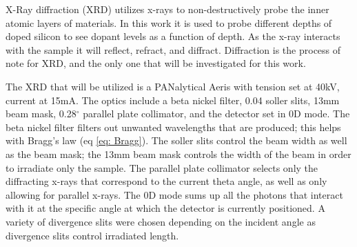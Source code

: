     X-Ray diffraction (XRD) utilizes x-rays to non-destructively probe the inner atomic layers of materials\cite{pandey_structural_2021}. 
    In this work it is used to probe different depths of doped silicon to see dopant levels as a function of depth. 
    As the x-ray interacts with the sample it will reflect, refract, and diffract. 
    Diffraction is the process of note for XRD, and the only one that will be investigated for this work. 
    
    The XRD that will be utilized is a PANalytical Aeris\cite{aeris_manual} with tension set at 40kV, current at 15mA. 
    The optics include a beta nickel filter, 0.04 soller slits, 13mm beam mask, 0.28$^\circ$ parallel plate collimator, and the detector set in 0D mode. 
    The beta nickel filter filters out unwanted wavelengths that are produced; this helps with Bragg's law (eq \ref{eq: Bragg}). 
    The soller slits control the beam width as well as the beam mask; the 13mm beam mask controls the width of the beam in order to irradiate only the sample. 
    The parallel plate collimator selects only the diffracting x-rays that correspond to the current theta angle, as well as only allowing for parallel x-rays. 
    The 0D mode sums up all the photons that interact with it at the specific angle at which the detector is currently positioned.
    A variety of divergence slits were chosen depending on the incident angle as divergence slits control irradiated length. 

